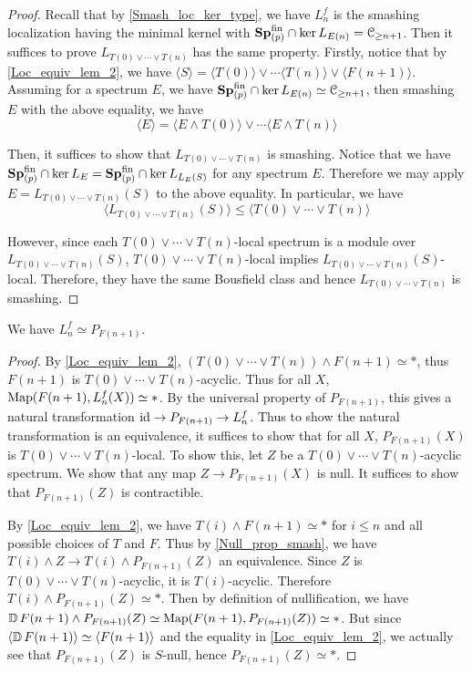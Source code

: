 	\begin{proof}
		Recall that by \cref{Smash_loc_ker_type}, we have $L_n^f$ is the smashing localization having the minimal kernel with $\mathbf{Sp}_{(p)}^{\text{fin}}\cap\ker L_{E(n)}=\mathcal{C}_{\geq n+1}$. Then it suffices to prove $L_{T(0)\vee\cdots\vee T(n)}$ has the same property. Firstly, notice that by \cref{Loc_equiv_lem_2}, we have $\langle S\rangle=\langle T(0)\rangle\vee\cdots\langle T(n)\rangle\vee\langle F(n+1)\rangle$. Assuming for a spectrum $E$, we have $\mathbf{Sp}_{(p)}^{\text{fin}}\cap\ker L_{E(n)}\simeq\mathcal{C}_{\geq n+1}$, then smashing $E$ with the above equality, we have 
		\[ \langle E\rangle=\langle E\wedge T(0)\rangle\vee\cdots\langle E\wedge T(n)\rangle \]

		Then, it suffices to show that $L_{T(0)\vee\cdots\vee T(n)}$ is smashing. Notice that we have $\mathbf{Sp}_{(p)}^{\text{fin}}\cap\ker L_E=\mathbf{Sp}_{(p)}^{\text{fin}}\cap\ker L_{L_E(S)}$ for any spectrum $E$. Therefore we may apply $E=L_{T(0)\vee\cdots\vee T(n)}(S)$ to the above equality. In particular, we have 
		\[ \langle L_{T(0)\vee\cdots\vee T(n)}(S)\rangle\leq\langle T(0)\vee\cdots\vee T(n)\rangle \]

		However, since each $T(0)\vee\cdots\vee T(n)$-local spectrum is a module over $L_{T(0)\vee\cdots\vee T(n)}(S)$, $T(0)\vee\cdots\vee T(n)$-local implies $L_{T(0)\vee\cdots\vee T(n)}(S)$-local. Therefore, they have the same Bousfield class and hence $L_{T(0)\vee\cdots\vee T(n)}$ is smashing. 
	\end{proof}

	\begin{thm}\label{Tel_loc_equiv_F_null}
		We have $L_n^f\simeq P_{F(n+1)}$. 
	\end{thm}

	\begin{proof}
		By \cref{Loc_equiv_lem_2}, $(T(0)\vee\cdots\vee T(n))\wedge F(n+1)\simeq*$, thus $F(n+1)$ is $T(0)\vee\cdots\vee T(n)$-acyclic. Thus for all $X$, $\operatorname{\mathrm{Map}}(F(n+1),L_n^f(X))\simeq*$. By the universal property of $P_{F(n+1)}$, this gives a natural transformation $\operatorname{\mathrm{id}}\to P_{F(n+1)}\to L_n^f$. Thus to show the natural transformation is an equivalence, it suffices to show that for all $X$, $P_{F(n+1)}(X)$ is $T(0)\vee\cdots\vee T(n)$-local. To show this, let $Z$ be a $T(0)\vee\cdots\vee T(n)$-acyclic spectrum. We show that any map $Z\to P_{F(n+1)}(X)$ is null. It suffices to show that $P_{F(n+1)}(Z)$ is contractible. 

		By \cref{Loc_equiv_lem_2}, we have $T(i)\wedge F(n+1)\simeq*$ for $i\leq n$ and all possible choices of $T$ and $F$. Thus by \cref{Null_prop_smash}, we have $T(i)\wedge Z\to T(i)\wedge P_{F(n+1)}(Z)$ an equivalence. Since $Z$ is $T(0)\vee\cdots\vee T(n)$-acyclic, it is $T(i)$-acyclic. Therefore $T(i)\wedge P_{F(n+1)}(Z)\simeq*$. Then by definition of nullification, we have $\operatorname{\mathbb{D}} F(n+1)\wedge P_{F(n+1)}(Z)\simeq\operatorname{\mathrm{Map}}(F(n+1),P_{F(n+1)}(Z))\simeq*$. But since $\langle \operatorname{\mathbb{D}} F(n+1)\rangle\simeq\langle F(n+1)\rangle$ and the equality in \cref{Loc_equiv_lem_2}, we actually see that $P_{F(n+1)}(Z)$ is $S$-null, hence $P_{F(n+1)}(Z)\simeq*$. 
	\end{proof}

